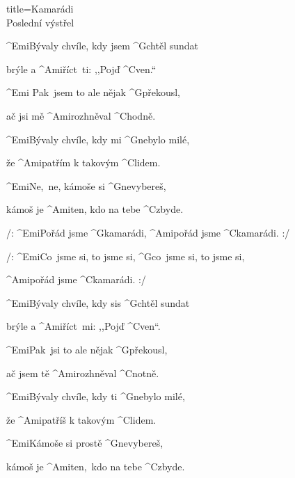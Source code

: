 \begin{song}{title=\predtitle\centering Kamarádi \\\large Poslední výstřel  \vspace*{-0.3cm}}  %
\nejnejvetsi

\begin{centerjustified}

\sloka
	^{Emi}Bývaly chvíle, kdy jsem ^{G}chtěl sundat

	brýle a ^{Ami\z}říct~ti: ,,Pojď ^{C}ven.``

	^{Emi \z}Pak~jsem to ale nějak ^{G\z}překousl,

	ač jsi mě ^{Ami\z}rozhněval ^{\z C}hodně.

\sloka
	^{Emi\z}Bývaly chvíle, kdy mi ^{G\z}nebylo milé,

	že ^{Ami\z}patřím k takovým ^{C\z}lidem.

	^{Emi\z}Ne,~ne, kámoše si ^{G\z}nevybereš,

	kámoš je ^{Ami\z}ten, kdo na tebe ^{C\z}zbyde.

	/: ^{Emi\z}Pořád jsme ^{\z G}kamarádi, ^{Ami\z}pořád jsme ^{\z C}kamarádi. :/

	/: ^{Emi\z}Co~jsme si, to jsme si, ^{G\z}co~jsme si, to jsme si,

	^{Ami\z}pořád jsme ^{\z C}kamarádi. :/

\sloka
	^{Emi}Bývaly chvíle, kdy sis ^{G}chtěl sundat

	brýle a ^{Ami\z}říct~mi: ,,Pojď ^{C}ven``.

	^{Emi\z}Pak~jsi to ale nějak ^{G\z}překousl,

	ač jsem tě ^{Ami\z}rozhněval ^{\z C}notně.

\end{centerjustified}
\newpage
\begin{centerjustified}

\sloka
	^{Emi\z}Bývaly chvíle, kdy ti ^{G\z}nebylo milé,

	že ^{Ami\z}patříš k takovým ^{C\z}lidem.

	^{Emi\z}Kámoše si prostě ^{G\z}nevybereš,

	kámoš je ^{Ami\z}ten,~kdo na tebe ^{C\z}zbyde.


\end{centerjustified}


\setcounter{Slokočet}{0}
\end{song}


